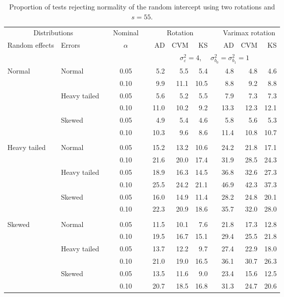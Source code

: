 \begin{table}[ht]
\centering
\caption{\label{tab:fixedsimb055} Proportion of tests rejecting normality of the random intercept using two rotations and $s = 55$.}
\begin{scriptsize}
\begin{tabular}{ll p{.1cm} c p{.1cm} rrr p{.1cm} rrr}
  \hline
  \multicolumn{2}{c}{Distributions}& & Nominal & &  \multicolumn{3}{c}{Rotation} & & \multicolumn{3}{c}{Varimax rotation} \\ \cline{1-2} \cline{6-8} \cline{10-12}   
  Random effects & Errors & & $\alpha$ & & AD & CVM & KS & & AD & CVM & KS \\ 
   \hline
& && && \multicolumn{7}{c}{$\sigma_{\varepsilon}^2 = 4$, \ \ $\sigma_{b_0}^2 = \sigma_{b_1}^2 = 1$} \\ \cline{6-12}
\rowcolor{gray!20} Normal & Normal &  & 0.05 &  & 5.2 & 5.5 & 5.4 &  & 4.8 & 4.8 & 4.6 \\ 
\rowcolor{gray!20}    &  &  & 0.10 &  & 9.9 & 11.1 & 10.5 &  & 8.8 & 9.2 & 8.8 \\ 
\rowcolor{gray!20}    & Heavy tailed &  & 0.05 &  & 5.6 & 5.2 & 5.5 &  & 7.9 & 7.3 & 7.3 \\ 
\rowcolor{gray!20}    &  &  & 0.10 &  & 11.0 & 10.2 & 9.2 &  & 13.3 & 12.3 & 12.1 \\ 
\rowcolor{gray!20}    & Skewed &  & 0.05 &  & 4.9 & 5.4 & 4.6 &  & 5.8 & 5.6 & 5.3 \\ 
\rowcolor{gray!20}    &  &  & 0.10 &  & 10.3 & 9.6 & 8.6 &  & 11.4 & 10.8 & 10.7 \\ 
&&&&&&&&&&&\\
  Heavy tailed & Normal &  & 0.05 &  & 15.2 & 13.2 & 10.6 &  & 24.2 & 21.8 & 17.1 \\ 
   &  &  & 0.10 &  & 21.6 & 20.0 & 17.4 &  & 31.9 & 28.5 & 24.3 \\ 
   & Heavy tailed &  & 0.05 &  & 18.9 & 16.3 & 14.5 &  & 36.8 & 32.6 & 27.3 \\ 
   &  &  & 0.10 &  & 25.5 & 24.2 & 21.1 &  & 46.9 & 42.3 & 37.3 \\ 
   & Skewed &  & 0.05 &  & 16.0 & 14.9 & 11.4 &  & 28.2 & 24.8 & 20.1 \\ 
   &  &  & 0.10 &  & 22.3 & 20.9 & 18.6 &  & 35.7 & 32.0 & 28.0 \\ 
&&&&&&&&&&&\\
  Skewed & Normal &  & 0.05 &  & 11.5 & 10.1 & 7.6 &  & 21.8 & 17.3 & 12.8 \\ 
   &  &  & 0.10 &  & 19.5 & 16.7 & 15.1 &  & 29.4 & 25.5 & 21.8 \\ 
   & Heavy tailed &  & 0.05 &  & 13.7 & 12.2 & 9.7 &  & 27.4 & 22.9 & 18.0 \\ 
   &  &  & 0.10 &  & 21.0 & 19.0 & 16.5 &  & 36.1 & 30.7 & 26.3 \\ 
   & Skewed &  & 0.05 &  & 13.5 & 11.6 & 9.0 &  & 23.4 & 15.6 & 12.5 \\ 
   &  &  & 0.10 &  & 20.7 & 18.5 & 16.8 &  & 31.3 & 24.7 & 20.6 \\ 


\end{tabular}
\end{scriptsize}
\end{table}
